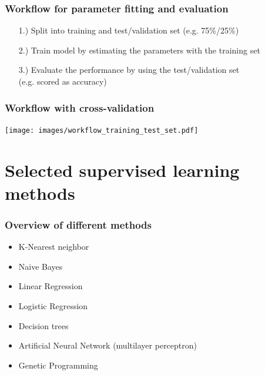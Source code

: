\documentclass[aspectratio=169]{beamer}
\begin{document}
\begin{frame}
  \frametitle{Workflow for parameter fitting and evaluation}
  \begin{block}{}
    \begin{center}
      \begin{itemize}
      \item[1.)] Split into training and test/validation set (e.g. 75\%/25\%)
      \item[2.)] Train model by estimating the parameters with the training set
      \item[3.)] Evaluate the performance by using the test/validation
        set \\(e.g. scored as accuracy)
      \end{itemize}
    \end{center}    
  \end{block}
\end{frame}


\begin{frame}
  \frametitle{Workflow with cross-validation}
  \begin{center}
    \texttt{[image: images/workflow\_training\_test\_set.pdf]}
  \end{center}    
\end{frame}


\section{Selected supervised learning methods}

\begin{frame}{}
   \tableofcontents[currentsection]
\end{frame}

\begin{frame}
  \frametitle{Overview of different methods}
  \begin{block}{}
    \begin{center}
      \begin{itemize}
      \item K-Nearest neighbor
      \item Naive Bayes
      \item Linear Regression
      \item Logistic Regression
      \item Decision trees
      \item Artificial Neural Network (multilayer perceptron)
      \item Genetic Programming
      \end{itemize}
    \end{center}    
  \end{block}
\end{frame}
\end{document}
